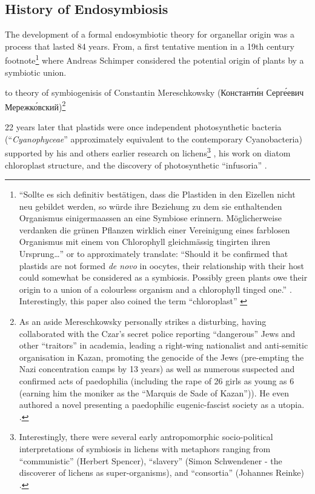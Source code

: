 \subsection{History of Endosymbiosis}

The development of a formal endosymbiotic theory for organellar origin was a process that
lasted 84 years. From, a first tentative mention in a 19th century footnote\footnote{``Sollte es sich definitiv best\"atigen, dass die Plastiden in den 
Eizellen nicht neu gebildet werden, so w\"urde ihre Beziehung zu dem sie 
enthaltenden Organismus einigermaassen an eine Symbiose erinnern. M\"oglicherweise
verdanken die gr\"unen Pflanzen wirklich einer Vereinigung eines farblosen Organismus
mit einem von Chlorophyll gleichm\"assig tingirten ihren Ursprung\ldots''
\citep{Schimper1883} or to approximately translate: ``Should it be confirmed
that plastids are not formed \textit{de novo} in oocytes, their relationship with
their host could somewhat be considered as a symbiosis.  Possibly green plants owe
their origin to a union of a colourless organism and a chlorophyll tinged one.''
\citep{Neuhauser2014}. Interestingly, this paper also coined the term ``chloroplast'' \citep{Sapp2002}} 
where Andreas Schimper considered the potential origin of plants by a symbiotic union. 


to theory of symbiogenisis of Constantin Mereschkowsky (Константи́н Серге́евич Мережко́вский)\footnote{As 
    an aside Mereschkowsky personally strikes a disturbing, having
    collaborated with the Czar's secret police reporting ``dangerous''
    Jews and other ``traitors'' in academia, leading a right-wing nationalist
    and anti-semitic organisation in Kazan, promoting the genocide of the Jews
    (pre-empting the Nazi concentration camps by 13 years) as well as numerous suspected and 
    confirmed acts of paedophilia (including the rape of 26 girls as young as 6 
    (earning him the moniker as the ``Marquis de Sade of Kazan'')).  
    He even authored a novel presenting a paedophilic eugenic-fascist
    society as a utopia.  
    \citep{Sapp2002}.}

22 years later that plastids were once independent photosynthetic bacteria 
(``\textit{Cyanophyceae}'' approximately equivalent to the contemporary Cyanobacteria) 
supported by his and others earlier research on lichens\footnote{Interestingly, 
    there were several early antropomorphic socio-political 
    interpretations of symbiosis in lichens with metaphors ranging from ``communistic'' 
    (Herbert Spencer), ``slavery'' (Simon Schwendener - the discoverer of lichens as
    super-organisms), and ``consortia'' (Johannes Reinke) \citep{Sapp2002}.}
, his work on diatom chloroplast structure, and the discovery of 
photosynthetic ``infusoria'' \citep{Mereschkowsky1905,Martin1999a,Sapp2002}. 

